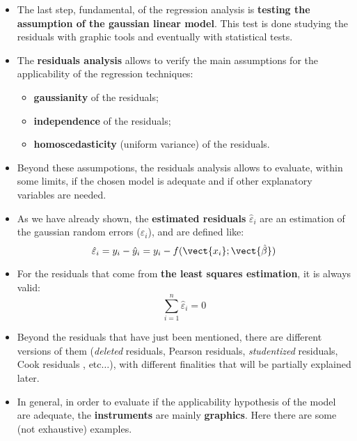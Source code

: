 \begin{frame}
  \vspace*{.25cm}
  \begin{itemize}
    \item The last step, fundamental, of the regression analysis is \textbf{testing the assumption of the gaussian linear model}. This test is done studying the residuals with graphic tools and eventually with statistical tests.
    \vspace*{.25cm}
    \item The \textbf{residuals analysis} allows to verify the main assumptions for the applicability of the regression techniques:
    \begin{normalsize}
      \begin{itemize}
        \item \textbf{gaussianity} of the residuals;
        \item \textbf{independence} of the residuals;
        \item \textbf{homoscedasticity} (uniform variance) of the residuals.
      \end{itemize}
    \end{normalsize}
    \vspace*{.25cm}
    \item Beyond these assumpotions, the residuals analysis allows to evaluate, within some limits, if the chosen model is adequate and if other explanatory variables are needed.
  \end{itemize}
\end{frame}

\begin{frame}
  \begin{itemize}
    \item As we have already shown, the \textbf{estimated residuals} {\boldmath$\hat{\varepsilon}_i$} are an estimation of the gaussian random errors ($\varepsilon_i$), and are defined like:
      \vspace{-0.3cm} $$ \hat{\varepsilon}_i = y_i-\hat{y}_i = y_i-f(\vect{x_i};\vect{\hat{\beta}}) $$
    \item For the residuals that come from \textbf{the least squares estimation}, it is always valid:
      \vspace{-0.3cm} $$ \sum_{i=1}^n \hat{\varepsilon}_i = 0 $$
    \item Beyond the residuals that have just been mentioned, there are different versions of them (\textit{deleted} residuals, Pearson residuals, \textit{studentized} residuals, Cook residuals , etc$\dots$), with different finalities that will be partially explained later.
    \item In general, in order to evaluate if the applicability hypothesis of the model are adequate, the \textbf{instruments} are mainly \textbf{graphics}. Here there are some (not exhaustive) examples.
  \end{itemize}
\end{frame}

